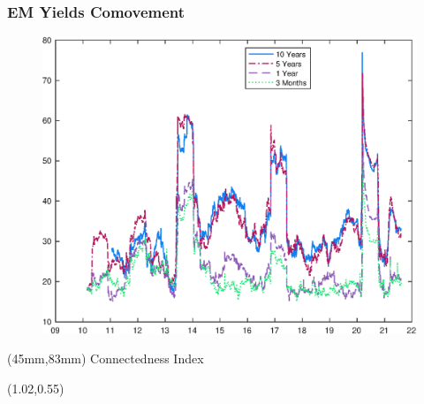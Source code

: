\documentclass[12pt, aspectratio=169, xcolor=dvipsnames]{beamer}
\begin{document}
\begin{frame}[label=DYindex]
\frametitle{EM Yields Comovement}
\begin{figure}[!htbp]
	\begin{center} %
		\includegraphics[trim={0cm 0cm 0cm 0cm},clip,height=0.8\textheight,width=0.85\linewidth]{../Figures/Estimation/dy_index_dn_data.eps}
		\par\end{center}
\end{figure}
\begin{textblock*}{10cm}(45mm,83mm)
	\footnotesize Connectedness Index \citep{DieboldYilmaz:2014}
\end{textblock*}
\begin{textblock*}{5cm}(1.02\textwidth,0.55\textheight)
	\hyperlink{RollingCorr}{}
\end{textblock*}
\end{frame}

\end{document}
